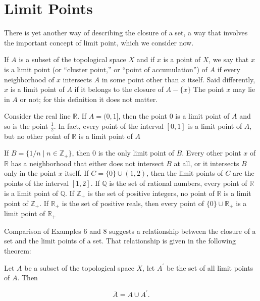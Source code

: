 \section*{Limit Points}

There is yet another way of describing the closure of a set, a way that involves the important concept of limit point, which we consider now.

If \(A\) is a subset of the topological space \(X\) and if \(x\) is a point of \(X\), we say that \(x\) is a limit point (or ``cluster point,'' or ``point of accumulation'') of \(A\) if every neighborhood of \(x\) intersects \(A\) in some point other than \(x\) itself. Said differently, \(x\) is a limit point of \(A\) if it belongs to the closure of \(A - \{ x\}\) The point \(x\) may lie in \(A\) or not; for this definition it does not matter.

\begin{centeredblock}
\begin{example}
\label{ex:\thesection.\theexample}
 Consider the real line \(\mathbb{R}\). If \(A = (0,1\rbrack\), then the point 0 is a limit point of \(A\) and so is the point \(\frac{1}{2}\). In fact, every point of the interval \([ {0,1}]\) is a limit point of \(A\), but no other point of \(\mathbb{R}\) is a limit point of \(A\)

 If \(B = \{ {1/n \mid n \in {\mathbb{Z}}_{ + }}\}\), then 0 is the only limit point of \(B\). Every other point \(x\) of \(\mathbb{R}\) has a neighborhood that either does not intersect \(B\) at all, or it intersects \(B\) only in the point \(x\) itself. If \(C = \{ 0\} \cup ( {1,2})\), then the limit points of \(C\) are the points of the interval \([ {1,2}]\). If \(\mathbb{Q}\) is the set of rational numbers, every point of \(\mathbb{R}\) is a limit point of \(\mathbb{Q}\). If \(\mathbb{Z}_{ + }\) is the set of positive integers, no point of \(\mathbb{R}\) is a limit point of \(\mathbb{Z}_{ + }\). If \(\mathbb{R}_{ + }\) is the set of positive reals, then every point of \(\{ 0\} \cup {\mathbb{R}}_{ + }\) is a limit point of \(\mathbb{R}_{ + }\)
\end{example}
\end{centeredblock}

Comparison of Examples 6 and 8 suggests a relationship between the closure of a set and the limit points of a set. That relationship is given in the following theorem:

\begin{theorem}
\label{thm:\thetheorem}
 Let \(A\) be a subset of the topological space \(X\), let \(A^{\prime }\) be the set of all limit points of \(A\). Then

 \[
 \bar{A} = A \cup {A}^{\prime }.
 \]
\end{theorem}

